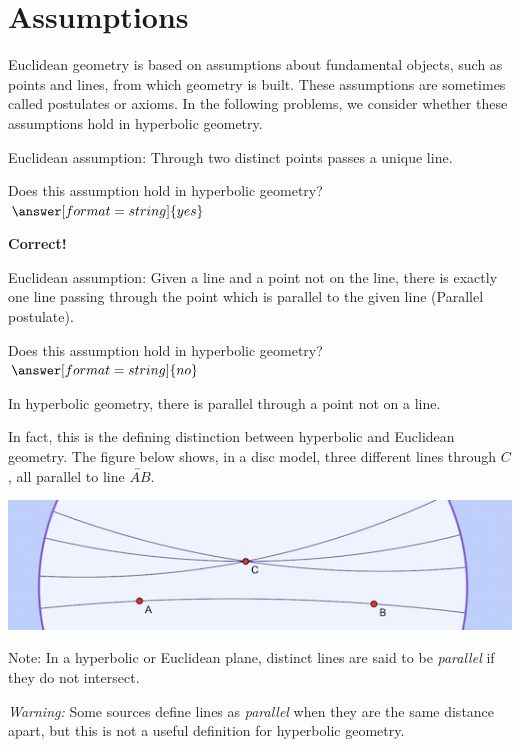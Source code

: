 \documentclass{ximera}
\begin{document}
\section*{Assumptions}
Euclidean geometry is based on assumptions about fundamental objects, such as points and lines, from which geometry is built. These assumptions are sometimes called postulates or axioms. In the following problems, we consider whether these assumptions hold in hyperbolic geometry. 


\begin{problem} %
Euclidean assumption: Through two distinct points passes a unique line.  

Does this assumption hold in hyperbolic geometry? 
$\answer[format=string]{yes}$

\begin{feedback}[correct]
\textbf{Correct!}   
\end{feedback}
\end{problem}

\begin{problem} %
Euclidean assumption: Given a line and a point not on the line, there is exactly one line passing through the point which is parallel to the given line (Parallel postulate).  

Does this assumption hold in hyperbolic geometry? 
$\answer[format=string]{no}$
\begin{problem}
In hyperbolic geometry, there is  parallel through a point not on a line. 
\begin{feedback}[correct]
In fact, this is the defining distinction between hyperbolic and Euclidean geometry.  The figure below shows, in a disc model, three different lines through $C$, all parallel to line $\overleftrightarrow{AB}$.  
\begin{center}
\includegraphics{hyperbolicParallels.png}
\end{center}
Note: In a hyperbolic or Euclidean plane, distinct lines are said to be \emph{parallel} if they do not intersect.  

{\color{red} \emph{Warning:} Some sources define lines as \emph{parallel} when they are the same distance apart, but this is not a useful definition for hyperbolic geometry.}  
\end{feedback}
\end{problem}
\end{problem}
\end{document}
